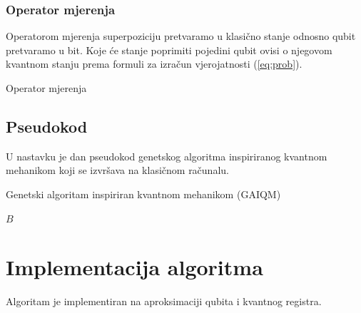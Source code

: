 \documentclass[times, utf8, zavrsni, numeric]{fer}
\begin{document}
\subsubsection{Operator mjerenja}
Operatorom mjerenja superpoziciju pretvaramo u klasično stanje odnosno qubit pretvaramo u bit. Koje će stanje poprimiti pojedini qubit ovisi o njegovom kvantnom stanju prema formuli za izračun vjerojatnosti (\ref{eq:prob}).
\begin{algorithm}
\caption{Operator mjerenja}
\label{algo:op_mjerenja}
\begin{algorithmic}
 
\ELSE
{}
\ENDIF
\end{algorithmic}
\end{algorithm}

\newpage

\subsection{Pseudokod}
U nastavku je dan pseudokod genetskog algoritma inspiriranog kvantnom mehanikom koji se izvršava na klasičnom računalu.

\begin{algorithm}
\caption{Genetski algoritam inspiriran kvantnom mehanikom (GAIQM)}
\label{algo:gaiqm}
\begin{algorithmic}
\ENDIF
{}
\ENDWHILE
\RETURN $B$
\end{algorithmic}
\end{algorithm}

\newpage

\section{Implementacija algoritma}
Algoritam je implementiran na aproksimaciji qubita i kvantnog registra.
\end{document}
